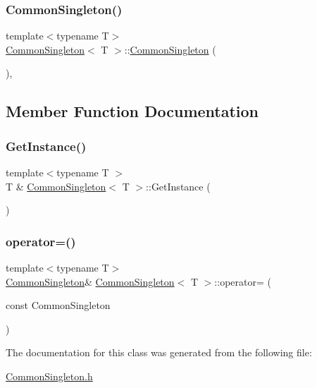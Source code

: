 \subsubsection{\texorpdfstring{CommonSingleton()}{CommonSingleton()}\hspace{0.1cm}{\footnotesize\ttfamily [2/2]}}
{\footnotesize\ttfamily template$<$typename T$>$ \\
\mbox{\hyperlink{class_common_singleton}{Common\+Singleton}}$<$ T $>$\+::\mbox{\hyperlink{class_common_singleton}{Common\+Singleton}} (\begin{DoxyParamCaption}{ }\end{DoxyParamCaption})\hspace{0.3cm}{\ttfamily [inline]}, {\ttfamily [protected]}}



\subsection{Member Function Documentation}
\mbox{\label{class_common_singleton_a77cfefba5f8a8a3302851c40bfc51e38}} 
\subsubsection{\texorpdfstring{GetInstance()}{GetInstance()}}
{\footnotesize\ttfamily template$<$typename T $>$ \\
T \& \mbox{\hyperlink{class_common_singleton}{Common\+Singleton}}$<$ T $>$\+::Get\+Instance (\begin{DoxyParamCaption}{ }\end{DoxyParamCaption})\hspace{0.3cm}{\ttfamily [static]}}

\mbox{\label{class_common_singleton_a4f30b3cc1365df03a07b04cb4095d6f0}} 
\subsubsection{\texorpdfstring{operator=()}{operator=()}}
{\footnotesize\ttfamily template$<$typename T$>$ \\
\mbox{\hyperlink{class_common_singleton}{Common\+Singleton}}\& \mbox{\hyperlink{class_common_singleton}{Common\+Singleton}}$<$ T $>$\+::operator= (\begin{DoxyParamCaption}\item[{const}]{Common\+Singleton }\end{DoxyParamCaption})\hspace{0.3cm}{\ttfamily [delete]}}



The documentation for this class was generated from the following file\+:\begin{DoxyCompactItemize}
\item 
\mbox{\hyperlink{_common_singleton_8h}{Common\+Singleton.\+h}}\end{DoxyCompactItemize}
